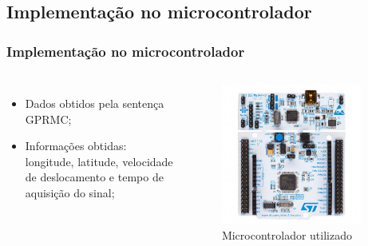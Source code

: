 \subsection{Implementação no microcontrolador}

\begin{frame}
\frametitle{Implementação no microcontrolador}
\begin{columns}

	\begin{itemize}
	\item Dados obtidos pela sentença GPRMC;
	\item Informações obtidas: longitude, latitude, velocidade de deslocamento e tempo de aquisição do sinal;
	\end{itemize}

	\begin{figure}[]
	 \centering
	 \captionsetup{width=0.9\textwidth,font=footnotesize,textfont=bf}
	 \includegraphics[width=0.9\textwidth,keepaspectratio]{Figuras/nucleo.jpg}
	 \vspace{-0.2cm}
	 \caption{Microcontrolador utilizado}
	\end{figure}
	
\end{columns}
\end{frame}

